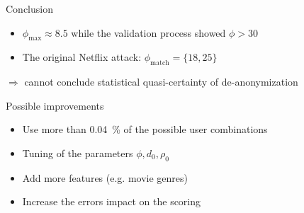 \begin{frame}{Conclusion}
\begin{itemize}
	\item $\phi_\text{max}\approx \num{8.5}$ while the validation process showed $\phi> 30$
	\item The original Netflix attack: $\phi_\text{match}=\{18, 25\}$
\end{itemize}

$\Rightarrow$ cannot conclude statistical quasi-certainty of de-anonymization

\begin{exampleblock}{Possible improvements}
	\begin{itemize}
		\item Use more than \SI{0.04}{\percent} of the possible user combinations
		\item Tuning of the parameters $\phi, d_0, \rho_0$
		\item Add more features (e.g. movie genres)
		\item Increase the errors impact on the scoring
	\end{itemize}
\end{exampleblock}
\end{frame}
